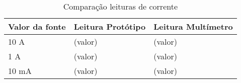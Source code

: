 \begin{table}[!ht]
    \centering
    \caption{Comparação leituras de corrente}
    \label{tab:compA}
    \begin{tabular}{|l|l|l|}
        \hline
        \textbf{Valor da fonte} & \textbf{Leitura Protótipo} & \textbf{Leitura Multímetro} \\ \hline
        10 A                    & (valor)                    & (valor)                     \\ \hline
        1 A                     & (valor)                    & (valor)                     \\ \hline
        10 mA                   & (valor)                    & (valor)                     \\ \hline
    \end{tabular}
\end{table}

